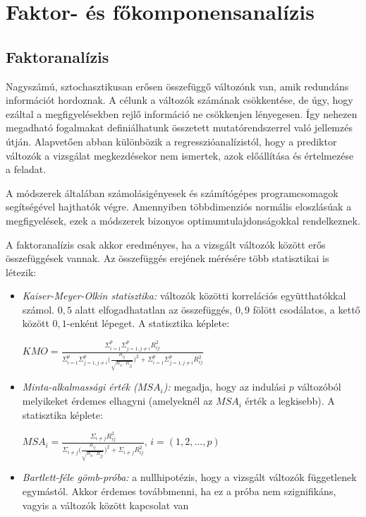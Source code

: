 \chapter{Faktor- és főkomponensanalízis}


\section{Faktoranalízis}

Nagyszámú, sztochasztikusan erősen összefüggő változónk van, amik redundáns információt hordoznak. A célunk a változók számának csökkentése, de úgy, hogy ezáltal a megfigyelésekben rejlő információ ne csökkenjen lényegesen. Így nehezen megadható fogalmakat definiálhatunk összetett mutatórendszerrel való jellemzés útján. Alapvetően abban különbözik a regresszióanalízistól, hogy a prediktor változók a vizsgálat megkezdésekor nem ismertek, azok előállítása és értelmezése a feladat.

A módszerek általában számolásigényesek és számítógépes programcsomagok segítségével hajthatók végre. Amennyiben többdimenziós normális eloszlásúak a megfigyelések, ezek a módszerek bizonyos optimumtulajdonságokkal rendelkeznek.

A faktoranalízis csak akkor eredményes, ha a vizsgált változók között erős összefüggések vannak. Az összefüggés erejének mérésére több statisztikai is létezik:
\begin{itemize}
\item \emph{Kaiser-Meyer-Olkin statisztika:} változók közötti korrelációs együtthatókkal számol. $0,5$ alatt elfogadhatatlan az összefüggés, $0,9$ fölött csodálatos, a kettő között $0,1$-enként lépeget. A statisztika képlete:

$KMO = \frac{\Sigma_{i=1}^p \Sigma_{j=1, j\neq i}^p R_{ij}^2}{\Sigma_{i=1}^p \Sigma_{j=1, j\neq i}^p \big(\frac{R_{ij}}{\sqrt{R_{ii}\cdot R_{jj}}} \big)^2 + \Sigma_{i=1}^p \Sigma_{j=1, j\neq i}^p R_{ij}^2}$

\item \emph{Minta-alkalmassági érték ($MSA_i$):} megadja, hogy az indulási $p$ változóból melyikeket érdemes elhagyni (amelyeknél az $MSA_i$ érték a legkisebb). A statisztika képlete:

$MSA_i = \frac{\Sigma_{i \neq j} R_{ij}^2}{\Sigma_{i \neq j} \big( \frac{R_{ij}}{\sqrt{R_{ii}\cdot R_{jj}}} \big)^2 + \Sigma_{i \neq j} R_{ij}^2}$, $i = (1,2,...,p)$

\item \emph{Bartlett-féle gömb-próba:} a nullhipotézis, hogy a vizsgált változók függetlenek egymástól. Akkor érdemes továbbmenni, ha ez a próba nem szignifikáns, vagyis a változók között kapcsolat van
\end{itemize}

